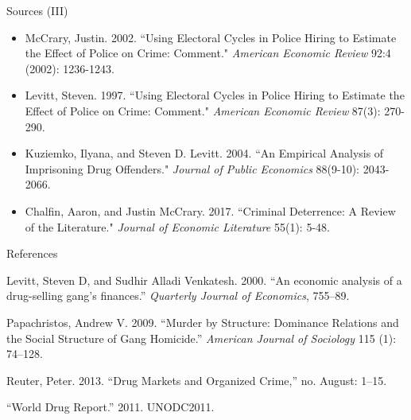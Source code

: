 \documentclass[10pt,ignorenonframetext,]{beamer}
\providecommand{\tightlist}{%
  \setlength{\itemsep}{0pt}\setlength{\parskip}{0pt}}
\begin{document}
\begin{frame}{Sources (III)}
\protect\hypertarget{sources-iii}{}

\begin{itemize}
\tightlist
\item
  McCrary, Justin. 2002. ``Using Electoral Cycles in Police Hiring to
  Estimate the Effect of Police on Crime: Comment."
  \textit{American Economic Review} 92:4 (2002): 1236-1243.
\item
  Levitt, Steven. 1997. ``Using Electoral Cycles in Police Hiring to
  Estimate the Effect of Police on Crime: Comment."
  \textit{American Economic Review} 87(3): 270-290.
\item
  Kuziemko, Ilyana, and Steven D. Levitt. 2004. ``An Empirical Analysis
  of Imprisoning Drug Offenders." \textit{Journal of Public Economics}
  88(9-10): 2043-2066.
\item
  Chalfin, Aaron, and Justin McCrary. 2017. ``Criminal Deterrence: A
  Review of the Literature." \textit{Journal of Economic Literature}
  55(1): 5-48.
\end{itemize}

\end{frame}

\begin{frame}{References}
\protect\hypertarget{references}{}

\hypertarget{refs}{}
\leavevmode\hypertarget{ref-Levitt2000}{}%
Levitt, Steven D, and Sudhir Alladi Venkatesh. 2000. ``An economic
analysis of a drug-selling gang's finances.'' \emph{Quarterly Journal of
Economics}, 755--89.

\leavevmode\hypertarget{ref-Papachristos2009}{}%
Papachristos, Andrew V. 2009. ``Murder by Structure: Dominance Relations
and the Social Structure of Gang Homicide.'' \emph{American Journal of
Sociology} 115 (1): 74--128.

\leavevmode\hypertarget{ref-Reuter2010}{}%
Reuter, Peter. 2013. ``Drug Markets and Organized Crime,'' no. August:
1--15.

\leavevmode\hypertarget{ref-UNODC2011}{}%
``World Drug Report.'' 2011. UNODC2011.

\end{frame}


\end{document}

